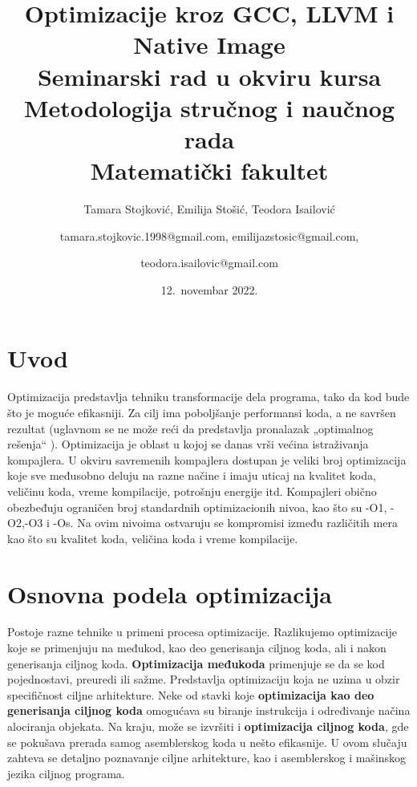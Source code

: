 \documentclass[a4paper]{article}
\begin{document}
\title{Optimizacije kroz GCC, LLVM i Native Image\\ \small{Seminarski rad u okviru kursa\\Metodologija stručnog i naučnog rada\\ Matematički fakultet}}
\author{Tamara Stojković, Emilija Stošić, Teodora Isailović \and tamara.stojkovic.1998@gmail.com, emilijazstosic@gmail.com, \and teodora.isailovic@gmail.com}
\date{12.~novembar 2022.}

\maketitle

\tableofcontents

\newpage

\section{Uvod}
\label{sec:uvod}
Optimizacija predstavlja tehniku transformacije dela programa,  tako da kod bude što je moguće efikasniji. 
Za cilj ima poboljšanje performansi koda, a ne savršen rezultat (uglavnom se ne može reći da predstavlja pronalazak „optimalnog rešenja“ ). 
Optimizacija je oblast u kojoj se danas vrši većina istraživanja kompajlera. 
U okviru savremenih kompajlera dostupan je veliki broj optimizacija koje sve međusobno deluju na razne načine i imaju uticaj na kvalitet koda, veličinu koda, vreme kompilacije, potrošnju energije itd. 
Kompajleri obično obezbeđuju ograničen broj  standardnih optimizacionih nivoa, kao što su -O1, -O2,-O3 i -Os. Na ovim nivoima ostvaruju se kompromisi između  različitih mera kao što su kvalitet koda, veličina koda i vreme kompilacije. \cite{uvod}

\section{Osnovna podela optimizacija}
\label{sec:podela}
Postoje razne tehnike u primeni procesa optimizacije. Razlikujemo optimizacije koje se primenjuju na međukod,  kao deo generisanja ciljnog koda, ali i nakon generisanja ciljnog koda.
\textbf{Optimizacija međukoda} primenjuje se da se kod pojednostavi, preuredi ili sažme. Predstavlja optimizaciju koja ne uzima u obzir specifičnost ciljne arhitekture.
Neke od stavki koje \textbf{optimizacija kao deo generisanja ciljnog koda} omogućava su biranje instrukcija i određivanje načina alociranja objekata. Na kraju, može se izvršiti i \textbf{optimizacija ciljnog koda}, gde se pokušava prerada samog asemblerskog koda u nešto efikasnije. 
U ovom slučaju zahteva se deta\-ljno poznavanje ciljne arhitekture, kao i asemblerskog i mašinskog jezika ciljnog programa. \cite{osnovnaPodela}\cite{dragonbook}
\end{document}
